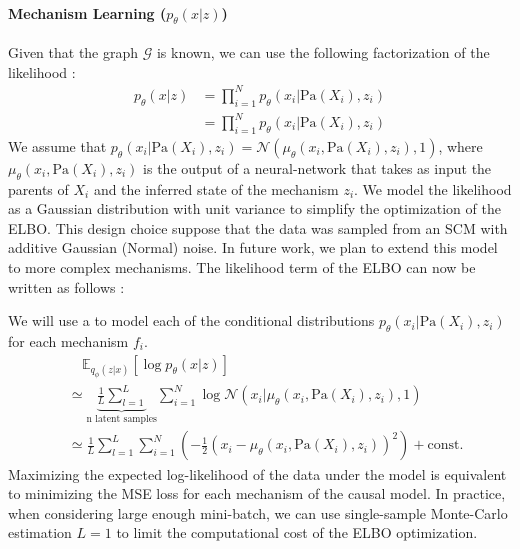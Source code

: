 \documentclass{article}
\begin{document}
\paragraph{Mechanism Learning ($p_\theta(x | z)$)}

Given that the graph $\mathcal{G}$ is known, we can use the following
factorization of the likelihood :
\begin{align*}
    p_\theta(x | z) & = \prod_{i = 1}^N p_\theta(x_i | \text{Pa}(X_i), z_i) \\
                    & = \prod_{i = 1}^N p_\theta(x_i | \text{Pa}(X_i), z_i)
\end{align*}
We assume that $p_\theta(x_i | \text{Pa}(X_i), z_i) = \mathcal{N}(\mu_\theta(x_i, \text{Pa}(X_i), z_i), 1)$, where $\mu_\theta(x_i, \text{Pa}(X_i), z_i)$ is the output of a neural-network that takes as input the parents of $X_i$ and the inferred state of the mechanism $z_i$. We model the likelihood as a Gaussian distribution with unit variance to simplify the optimization of the ELBO. This design choice suppose that the data was sampled from an SCM with additive Gaussian (Normal) noise. In future work, we plan to extend this model to more complex mechanisms.
The likelihood term of the ELBO can now be written as follows :

We will use a to model each of the conditional distributions $p_\theta(x_i |
    \text{Pa}(X_i), z_i)$ for each mechanism $f_i$.
\begin{align*}
     & \quad \mathbb{E}_{q_\phi(z | x)} \left[ \log p_\theta(x | z) \right]                                                                                     \\ &\simeq \underbrace{\frac{1}{L} \sum_{l = 1}^L }_{\text{n latent samples}} \sum_{i = 1}^N \log \mathcal{N}(x_i | \mu_\theta(x_i, \text{Pa}(X_i), z_i), 1)\\
     & \simeq \frac{1}{L} \sum_{l = 1}^L \sum_{i = 1}^N \left( -\frac{1}{2} \left( x_i - \mu_\theta(x_i, \text{Pa}(X_i), z_i) \right)^2 \right) + \text{const.}
\end{align*}
Maximizing the expected log-likelihood of the data under the model is equivalent to minimizing the MSE loss for each mechanism of the causal model. In practice, when considering large enough mini-batch, we can use single-sample Monte-Carlo estimation $L=1$ to limit the computational cost of the ELBO optimization.
\end{document}
